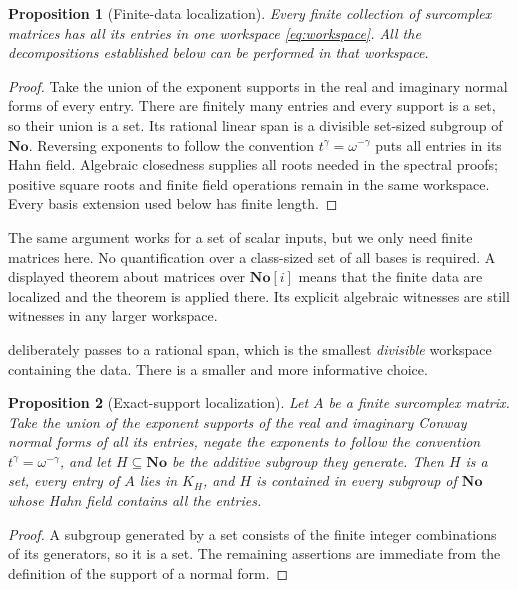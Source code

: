 \documentclass[11pt,a4paper]{article}
\numberwithin{equation}{section}
\newtheorem{proposition}[proposition]{Proposition}
\theoremstyle{definition}
\theoremstyle{remark}
\newcommand{\No}{\mathbf{No}}
\newcommand{\SC}{\mathbf{No}[i]}
\begin{document}
\begin{proposition}[Finite-data localization]\label{prop:localization}
Every finite collection of surcomplex matrices has all its entries in one
workspace \eqref{eq:workspace}. All the decompositions established below can
be performed in that workspace.
\end{proposition}
\begin{proof}
Take the union of the exponent supports in the real and imaginary normal
forms of every entry. There are finitely many entries and every support is
a set, so their union is a set. Its rational linear span is a divisible
set-sized subgroup of $\No$. Reversing exponents to follow the convention
$t^\gamma=\omega^{-\gamma}$ puts all entries in its Hahn field.
Algebraic closedness supplies all roots needed in the spectral proofs;
positive square roots and finite field operations remain in the same
workspace. Every basis extension used below has finite length.
\end{proof}

The same argument works for a set of scalar inputs, but we only need finite
matrices here. No quantification over a class-sized set of all bases is
required. A displayed theorem about matrices over $\SC$ means that the
finite data are localized and the theorem is applied there. Its explicit
algebraic witnesses are still witnesses in any larger workspace.

 deliberately passes to a rational span, which is
the smallest \emph{divisible} workspace containing the data. There is a
smaller and more informative choice.

\begin{proposition}[Exact-support localization]\label{spec:prop:exactlocalization}
Let $A$ be a finite surcomplex matrix. Take the union of the exponent
supports of the real and imaginary Conway normal forms of all its entries,
negate the exponents to follow the convention $t^\gamma=\omega^{-\gamma}$,
and let $H\subseteq\No$ be the additive subgroup they generate. Then $H$ is
a set, every entry of $A$ lies in $K_H$, and $H$ is contained in every
subgroup of $\No$ whose Hahn field contains all the entries.
\end{proposition}
\begin{proof}
A subgroup generated by a set consists of the finite integer combinations of
its generators, so it is a set. The remaining assertions are immediate from
the definition of the support of a normal form.
\end{proof}
\end{document}
